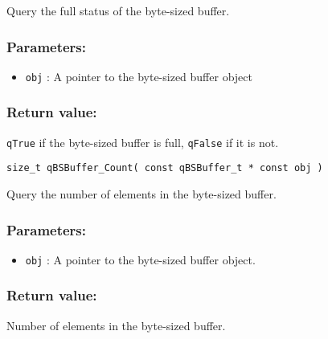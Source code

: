 Query the full status of the byte-sized buffer. 

\subsubsection*{Parameters:}
\begin{itemize}
    \item \lstinline{obj} : A pointer to the byte-sized buffer object
\end{itemize}

\subsubsection*{Return value:}
\lstinline{qTrue} if the byte-sized buffer is full, \lstinline{qFalse} if it is not.


\noindent\hrulefill

\begin{lstlisting}[style=CStyle]
size_t qBSBuffer_Count( const qBSBuffer_t * const obj )
\end{lstlisting}

Query the number of elements in the byte-sized buffer. 

\subsubsection*{Parameters:}
\begin{itemize}
    \item \lstinline{obj} : A pointer to the byte-sized buffer object.
\end{itemize}

\subsubsection*{Return value:}
Number of elements in the byte-sized buffer.

